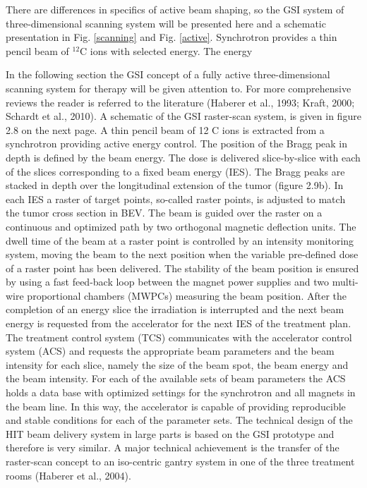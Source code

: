 \documentclass[type=dr, dr=rernat, accentcolor=tud7b,colorbacktitle, bigchapter, openright, twoside, 12pt ]{tudthesis}
\begin{document}
There are differences in specifics of active beam shaping, so the GSI system of three-dimensional scanning system will be presented here \cite{Haberer1993,Kraft2000,Schardt2010} and a schematic presentation in Fig. \ref{scanning} and Fig. \ref{active}.
Synchrotron provides a thin pencil beam of $^{12}$C ions with selected energy. The energy

In the following section the GSI concept of a fully active three-dimensional scanning system
for therapy will be given attention to. For more comprehensive reviews the reader is referred
to the literature (Haberer et al., 1993; Kraft, 2000; Schardt et al., 2010). A schematic of the
GSI raster-scan system, is given in figure 2.8 on the next page. A thin pencil beam of 12 C ions is
extracted from a synchrotron providing active energy control. The position of the Bragg peak in
depth is defined by the beam energy. The dose is delivered slice-by-slice with each of the slices
corresponding to a fixed beam energy (IES). The Bragg peaks are stacked in depth over the
longitudinal extension of the tumor (figure 2.9b). In each IES a raster of target points, so-called
raster points, is adjusted to match the tumor cross section in BEV. The beam is guided over the
raster on a continuous and optimized path by two orthogonal magnetic deflection units. The
dwell time of the beam at a raster point is controlled by an intensity monitoring system, moving
the beam to the next position when the variable pre-defined dose of a raster point has been
delivered. The stability of the beam position is ensured by using a fast feed-back loop between
the magnet power supplies and two multi-wire proportional chambers (MWPCs) measuring the
beam position. After the completion of an energy slice the irradiation is interrupted and the
next beam energy is requested from the accelerator for the next IES of the treatment plan. The
treatment control system (TCS) communicates with the accelerator control system (ACS) and
requests the appropriate beam parameters and the beam intensity for each slice, namely the
size of the beam spot, the beam energy and the beam intensity. For each of the available sets
of beam parameters the ACS holds a data base with optimized settings for the synchrotron and
all magnets in the beam line. In this way, the accelerator is capable of providing reproducible
and stable conditions for each of the parameter sets. The technical design of the HIT beam
delivery system in large parts is based on the GSI prototype and therefore is very similar. A
major technical achievement is the transfer of the raster-scan concept to an iso-centric gantry
system in one of the three treatment rooms (Haberer et al., 2004).
\end{document}
